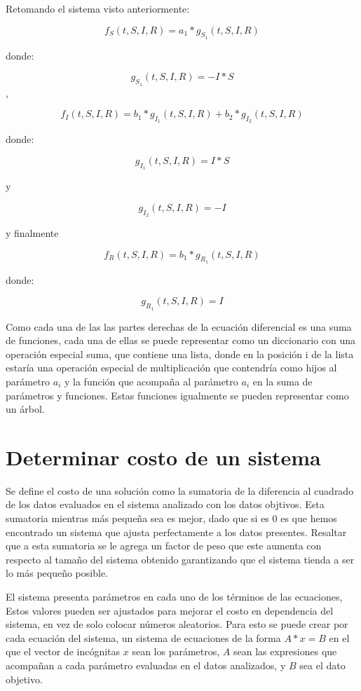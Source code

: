Retomando el sistema visto anteriormente:

$$f_S (t,S,I,R) = a_1 * g_{S_1} (t,S,I,R)$$

donde:

$$g_{S_1}(t,S,I,R) = -I*S$$,

$$f_I (t,S,I,R) = b_1 * g_{I_1} (t,S,I,R) + b_2 * g_{I_2} (t,S,I,R)$$

donde:

$$g_{I_1}(t,S,I,R) = I*S$$

y

$$g_{I_2}(t,S,I,R) = -I$$

y finalmente

$$f_R (t,S,I,R) = b_1 * g_{R_1} (t,S,I,R)$$

donde:

$$g_{R_1}(t,S,I,R) = I$$

Como cada una de las las partes derechas de la ecuación diferencial es una suma de funciones, cada una de ellas se puede representar como un diccionario con una operación especial suma, que contiene una lista, donde en la posición i de la lista estaría una operación especial de multiplicación que contendría como hijos al parámetro $a_i$ y la función que acompaña al parámetro $a_i$ en la suma de parámetros y funciones. Estas funciones igualmente se pueden representar como un árbol.

\section{Determinar costo de un sistema}

Se define el costo de una solución como la sumatoria de la diferencia al cuadrado de los datos evaluados en el sistema analizado con los datos objtivos. Esta sumatoria mientras más pequeña sea es mejor, dado que si es 0 es que hemos encontrado un sistema que ajusta perfectamente a los datos presentes. Resaltar que a esta sumatoria se le agrega un factor de peso que este aumenta con respecto al tamaño del sistema obtenido garantizando que el sistema tienda a ser lo más pequeño posible.

El sistema presenta parámetros en cada uno de los términos de las ecuaciones, Estos valores pueden ser ajustados para mejorar el costo en dependencia del sistema, en vez de solo colocar números aleatorios. Para esto se puede crear por cada ecuación del sistema, un sistema de ecuaciones de la forma $A * x = B$ en el que el vector de incógnitas $x$ sean los parámetros, $A$ sean las expresiones que acompañan a cada parámetro evaluadas en el datos analizados, y $B$ sea el dato objetivo.

